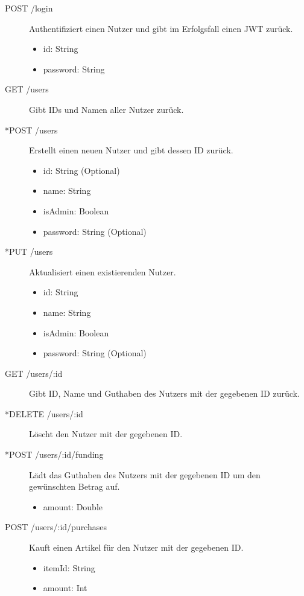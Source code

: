 \documentclass[a4paper, 11pt]{article}
\begin{document}
\begin{description}
	\item[POST /login] Authentifiziert einen Nutzer und gibt im Erfolgsfall einen JWT zurück.
	\begin{itemize}
		\item id: String
		\item password: String
	\end{itemize}

	\item[GET /users] Gibt IDs und Namen aller Nutzer zurück.
	
	\item[*POST /users] Erstellt einen neuen Nutzer und gibt dessen ID zurück.
	\begin{itemize}
		\item id: String (Optional)
		\item name: String
		\item isAdmin: Boolean
		\item password: String (Optional)
	\end{itemize}

	\item[*PUT /users] Aktualisiert einen existierenden Nutzer.
	\begin{itemize}
		\item id: String
		\item name: String
		\item isAdmin: Boolean
		\item password: String (Optional)
	\end{itemize}

	\item[GET /users/:id] Gibt ID, Name und Guthaben des Nutzers mit der gegebenen ID zurück.
	
	\item[*DELETE /users/:id] Löscht den Nutzer mit der gegebenen ID.
	
	\item[*POST /users/:id/funding] Lädt das Guthaben des Nutzers mit der gegebenen ID um den gewünschten Betrag auf.
	\begin{itemize}
		\item amount: Double
	\end{itemize}

	\item[POST /users/:id/purchases] Kauft einen Artikel für den Nutzer mit der gegebenen ID.
	\begin{itemize}
		\item itemId: String
		\item amount: Int
	\end{itemize}


\end{description}
\end{document}
